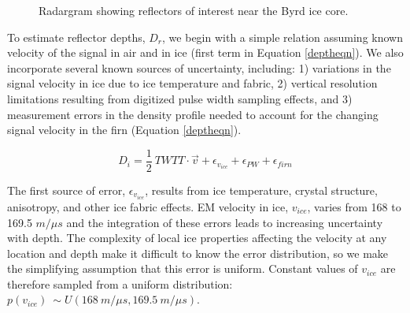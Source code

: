 \begin{figure}[h]
\centering
{}
\caption{Radargram showing reflectors of interest near the Byrd ice core.  }
\label{fig:layergram}
\end{figure}


To estimate reflector depths, $D_r$, we begin with a simple relation assuming known velocity of the signal in air and in ice (first term in Equation \ref{deptheqn}). We also incorporate several known sources of uncertainty, including: 1) variations in the signal velocity in ice due to ice temperature and fabric, 2) vertical resolution limitations resulting from digitized pulse width sampling effects, and 3) measurement errors in the density profile needed to account for the changing signal velocity in the firn (Equation \ref{deptheqn}).

\begin{equation}\label{deptheqn}
D_i = \frac{1}{2}~TWTT \cdot \vec{v} + \epsilon_{v_{ice}} + \epsilon_{PW} + \epsilon_{firn}
\end{equation}

The first source of error, $\epsilon_{v_{ice}}$, results from ice temperature, crystal structure, anisotropy, and other ice fabric effects. EM velocity in ice, $v_{ice}$, varies from 168 to 169.5 $m/{\mu}s$ \citep{fujita2000} and the integration of these errors leads to increasing uncertainty with depth.  The complexity of local ice properties affecting the velocity at any location and depth make it difficult to know the error distribution, so we make the simplifying assumption that this error is uniform. Constant values of $v_{ice}$ are therefore sampled from a uniform distribution: $p(v_{ice}) ~\sim U(168~m/{\mu}s,169.5~m/{\mu}s)$.

